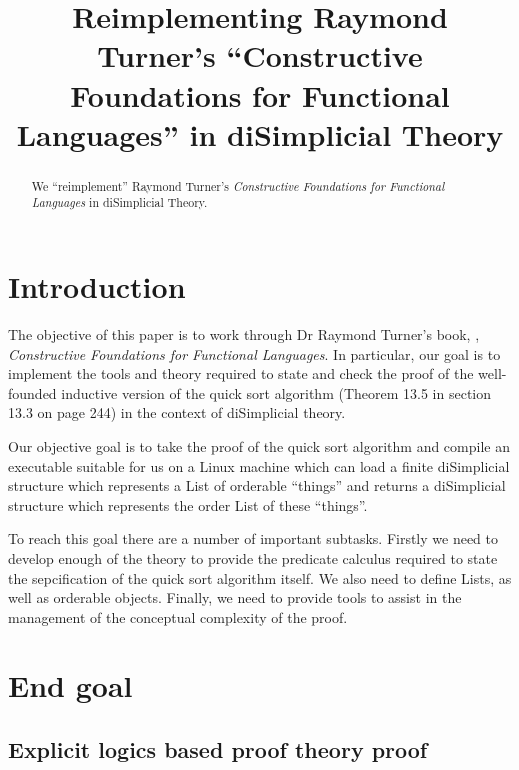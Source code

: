 \documentclass[a4paper,openany]{amsbook}
\begin{document}
\frontmatter
\sloppy

\title[Constructive Foundations]{Reimplementing Raymond Turner's ``Constructive Foundations 
for Functional Languages'' in diSimplicial Theory}

%

\begin{abstract}
We ``reimplement'' Raymond Turner's \emph{Constructive Foundations for Functional
Languages} in diSimplicial Theory.
\end{abstract} 
\maketitle 
\tableofcontents 
\mainmatter

\section{Introduction}

The objective of this paper is to work through Dr Raymond Turner's book,
\cite{turner1991constructiveFoundations}, \emph{Constructive Foundations for
Functional Languages}. In particular, our goal is to implement the tools and
theory required to state and check the proof of the well-founded inductive
version of the quick sort algorithm (Theorem 13.5 in section 13.3 on page 244)
in the context of diSimplicial theory.

Our objective goal is to take the proof of the quick sort algorithm and compile
an executable suitable for us on a Linux machine which can load a finite
diSimplicial structure which represents a List of orderable ``things'' and
returns a diSimplicial structure which represents the order List of these
``things''.

To reach this goal there are a number of important subtasks. Firstly we need to
develop enough of the theory to provide the predicate calculus required to state
the sepcification of the quick sort algorithm itself. We also need to define
Lists, as well as orderable objects. Finally, we need to provide tools to assist
in the management of the conceptual complexity of the proof.

\section{End goal}

\subsection{Explicit logics based proof theory proof}
\end{document}
